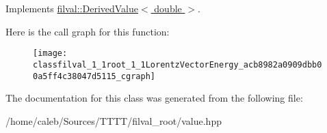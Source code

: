 Implements \hyperlink{classfilval_1_1DerivedValue_a74e04450a550454510329a9e6b941304}{filval\+::\+Derived\+Value$<$ double $>$}.

Here is the call graph for this function\+:
\nopagebreak
\begin{figure}[H]
\begin{center}
\leavevmode
\texttt{[image: classfilval\_1\_1root\_1\_1LorentzVectorEnergy\_acb8982a0909dbb00a5ff4c38047d5115\_cgraph]}
\end{center}
\end{figure}


The documentation for this class was generated from the following file\+:\begin{DoxyCompactItemize}
\item 
/home/caleb/\+Sources/\+T\+T\+T\+T/filval\+\_\+root/value.\+hpp\end{DoxyCompactItemize}
